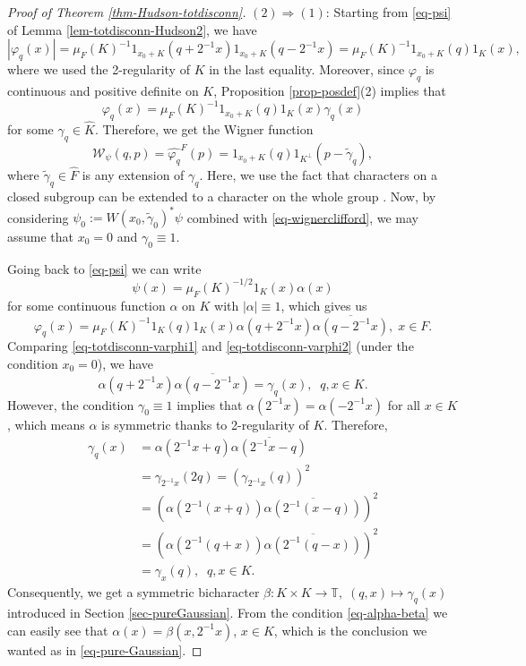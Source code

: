 \documentclass[12pt,reqno]{amsart}
\theoremstyle{definition}
\theoremstyle{definition}
\theoremstyle{definition}
\numberwithin{thm}{section}
\numberwithin{equation}{section}
\newcommand{\tor}{\mathbb{T}}
\begin{document}
\begin{proof}[Proof of Theorem \ref{thm-Hudson-totdisconn}] $(2)\Rightarrow(1)$:
Starting from \eqref{eq-psi} of Lemma \ref{lem-totdisconn-Hudson2}, we have
    $$|\varphi_q(x)|=\mu_F(K)^{-1}1_{x_0+K}(q+2^{-1}x)1_{x_0+K}(q-2^{-1}x)=\mu_F(K)^{-1}1_{x_0+K}(q)1_{K}(x),$$
where we used the 2-regularity of $K$ in the last equality. Moreover, since $\varphi_q$ is continuous and positive definite on $K$, Proposition \ref{prop-posdef}(2) implies that
\begin{equation} \label{eq-totdisconn-varphi1}
    \varphi_q(x)=\mu_F(K)^{-1}1_{x_0+K}(q)1_K(x)\gamma_q(x)
\end{equation}
for some $\gamma_q\in \widehat{K}$. Therefore, we get the Wigner function
$$\mathcal{W}_{\psi}(q,p)=\widehat{\varphi_q}^F(p)=1_{x_0+K}(q)1_{K^{\perp}}(p-\widetilde{\gamma}_q),$$
where $\tilde{\gamma}_q\in \widehat{F}$ is any extension of $\gamma_q$. Here, we use the fact that characters on a closed subgroup can be extended to a character on the whole group \cite[Theorem 4.2.14]{ReiSte}. Now, by considering $\psi_0:=W(x_0,\widetilde{\gamma}_0)^*\psi$ combined with \eqref{eq-wignerclifford}, we may assume that $x_0=0$ and $\gamma_0\equiv 1$.

Going back to \eqref{eq-psi} we can write
    $$\psi(x)=\mu_F(K)^{-1/2}1_K(x)\alpha(x)$$
for some continuous function $\alpha$ on $K$ with $|\alpha|\equiv 1$, which gives us
\begin{equation}\label{eq-totdisconn-varphi2}
    \varphi_q(x)=\mu_F(K)^{-1}1_K(q)1_K(x)\alpha(q+2^{-1}x)\overline{\alpha(q-2^{-1}x)}, \; x\in F.
\end{equation}
Comparing \eqref{eq-totdisconn-varphi1} and \eqref{eq-totdisconn-varphi2} (under the condition $x_0=0$), we have
    \begin{equation}\label{eq-alpha-beta}
        \alpha(q+2^{-1}x)\overline{\alpha(q-2^{-1}x)}=\gamma_q(x),\;\;q,x\in K.
    \end{equation}
However, the condition $\gamma_0\equiv 1$ implies that $\alpha(2^{-1}x)=\alpha(-2^{-1}x)$ for all $x \in K$, which means $\alpha$ is symmetric thanks to 2-regularity of $K$. Therefore,
\begin{align*}
    \gamma_q(x)&=\alpha(2^{-1}x+q)\overline{\alpha(2^{-1}x-q)}\\
    &=\gamma_{2^{-1}x}(2q)=(\gamma_{2^{-1}x}(q))^2\\
    &=\left(\alpha(2^{-1}(x+q))\overline{\alpha(2^{-1}(x-q))}\right)^2\\
    &=\left(\alpha(2^{-1}(q+x))\overline{\alpha(2^{-1}(q-x))}\right)^2\\
    &=\gamma_x(q),\;\; q,x \in K.
\end{align*}
Consequently, we get a symmetric bicharacter $\beta: K\times K \to \tor,\; (q,x)\mapsto \gamma_q(x)$ introduced in Section \ref{sec-pureGaussian}. From the condition \eqref{eq-alpha-beta} we can easily see that $\alpha(x) = \beta(x,2^{-1}x)$, $x\in K$, which is the conclusion we wanted as in \eqref{eq-pure-Gaussian}.
\end{proof}
\end{document}
